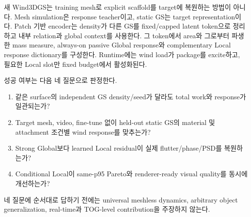 \documentclass[11pt]{article}
\begin{document}
새 Wind3DGS는 training mesh로 explicit scaffold를 target에 복원하는 방법이 아니다.
Mesh simulation은 response teacher이고, static GS는 target representation이다.
Patch 기반 encoder는 density가 다른 GS를 fixed/capped latent token으로 정리하고 내부 relation과 global context를 사용한다.
그 token에서 area와 그로부터 파생한 mass measure, always-on passive Global response와
complementary Local response dictionary를 구성한다.
Runtime에는 wind load가 package를 excite하고, 필요한 Local slot만 fixed budget에서 활성화된다.

성공 여부는 다음 네 질문으로 판정한다.
\begin{enumerate}
  \item 같은 surface의 independent GS density/seed가 달라도 total work와 response가 일관되는가?
  \item Target mesh, video, fine-tune 없이 held-out static GS의 material 및 attachment 조건별 wind response를 맞추는가?
  \item Strong Global보다 learned Local residual이 실제 flutter/phase/PSD를 복원하는가?
  \item Conditional Local이 same-p95 Pareto와 renderer-ready visual quality를 동시에 개선하는가?
\end{enumerate}

네 질문에 순서대로 답하기 전에는 universal meshless dynamics, arbitrary object generalization,
real-time과 TOG-level contribution을 주장하지 않는다.


\begingroup
\sloppy
\raggedright

\endgroup
\end{document}
